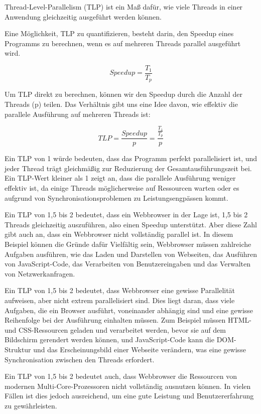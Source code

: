 Thread-Level-Parallelism (TLP) ist ein Maß dafür, wie viele Threads in einer Anwendung gleichzeitig ausgeführt werden können. 

Eine Möglichkeit, TLP zu quantifizieren, besteht darin, den Speedup eines Programms zu berechnen, wenn es auf mehreren Threads parallel ausgeführt wird.

\begin{equation}
    Speedup = \frac{T_1}{T_p}
\end{equation}

Um TLP direkt zu berechnen, können wir den Speedup durch die Anzahl der Threads (p) teilen. Das Verhältnis gibt uns eine Idee davon, wie effektiv die parallele Ausführung auf mehreren Threads ist:

\begin{equation}
    TLP = \frac{Speedup}{p} = \frac{\frac{T_1}{T_p}}{p}
\end{equation}

Ein TLP von 1 würde bedeuten, dass das Programm perfekt parallelisiert ist, und jeder Thread trägt gleichmäßig zur Reduzierung der Gesamtausführungszeit bei. Ein TLP-Wert kleiner als 1 zeigt an, dass die parallele Ausführung weniger effektiv ist, da einige Threads möglicherweise auf Ressourcen warten oder es aufgrund von Synchronisationsproblemen zu Leistungsengpässen kommt.

Ein TLP von 1,5 bis 2 bedeutet, dass ein Webbrowser in der Lage ist, 1,5 bis 2 Threads gleichzeitig auszuführen, also einen Speedup unterstützt. Aber diese Zahl gibt auch an, dass ein Webbrowser nicht vollständig parallel ist. In diesem Beispiel können die Gründe dafür Vielfältig sein, Webbrowser müssen zahlreiche Aufgaben ausführen, wie das Laden und Darstellen von Webseiten, das Ausführen von JavaScript-Code, das Verarbeiten von Benutzereingaben und das Verwalten von Netzwerkanfragen. 

Ein TLP von 1,5 bis 2 bedeutet, dass Webbrowser eine gewisse Parallelität aufweisen, aber nicht extrem parallelisiert sind. Dies liegt daran, dass viele Aufgaben, die ein Browser ausführt, voneinander abhängig sind und eine gewisse Reihenfolge bei der Ausführung einhalten müssen. Zum Beispiel müssen HTML- und CSS-Ressourcen geladen und verarbeitet werden, bevor sie auf dem Bildschirm gerendert werden können, und JavaScript-Code kann die DOM-Struktur und das Erscheinungsbild einer Webseite verändern, was eine gewisse Synchronisation zwischen den Threads erfordert.

Ein TLP von 1,5 bis 2 bedeutet auch, dass Webbrowser die Ressourcen von modernen Multi-Core-Prozessoren nicht vollständig ausnutzen können. In vielen Fällen ist dies jedoch ausreichend, um eine gute Leistung und Benutzererfahrung zu gewährleisten.

